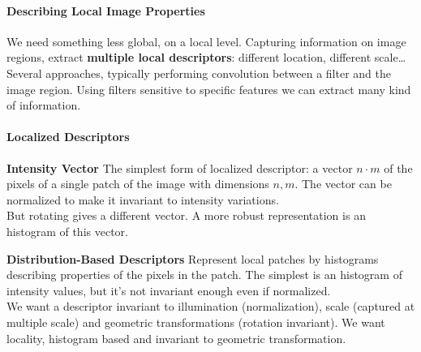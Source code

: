 \documentclass[10pt]{report}
\begin{document}
\paragraph{Describing Local Image Properties} We need something less global, on a local level. Capturing information on image regions, extract \textbf{multiple local descriptors}: different location, different scale\ldots\\
Several approaches, typically performing convolution between a filter and the image region. Using filters sensitive to specific features we can extract many kind of information.
\paragraph{Localized Descriptors}
\begin{list}{}{}
	\item \textbf{Intensity Vector} The simplest form of localized descriptor: a vector $n\cdot m$ of the pixels of a single patch of the image with dimensions $n,m$. The vector can be normalized to make it invariant to intensity variations.\\
	But rotating gives a different vector. A more robust representation is an histogram of this vector.
	\item \textbf{Distribution-Based Descriptors} Represent local patches by histograms describing properties of the pixels in the patch. The simplest is an histogram of intensity values, but it's not invariant enough even if normalized.\\
	We want a descriptor invariant to illumination (normalization), scale (captured at multiple scale) and geometric transformations (rotation invariant). We want locality, histogram based and invariant to geometric transformation.
\end{list}
\end{document}
